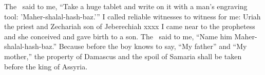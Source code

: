 
\begin{inparaenum}
   The \lord\ said to me, ``Take a huge tablet and write on it with a man's engraving tool: 'Maher-shalal-hash-baz.'\thinspace''%
   I called reliable witnesses to witness for me: Uriah the priest and Zechariah son of Jeberechiah xxxx%
   I came near to the prophetess and she conceived and gave birth to a son. The \lord\ said to me, ``Name him Maher-shalal-hash-baz.''%
   Because before the boy knows to say, ``My father'' and ``My mother,'' the property of Damascus and the spoil of Samaria shall be taken before the king of Assyria.%
  
  
  
  
  
  
\end{inparaenum}
